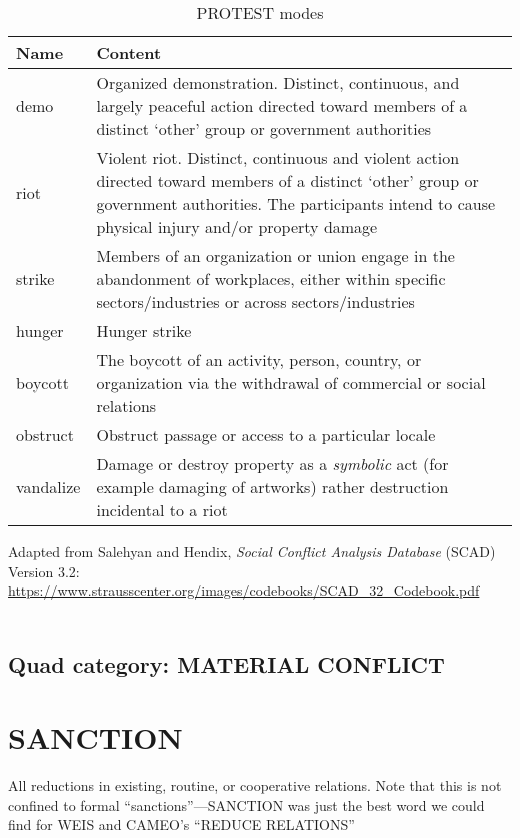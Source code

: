\documentclass[11pt]{report}
\newcommand{\plcat}[1]{\textsf{#1}}
\begin{document}
\begin{table}[htp]
\caption{PROTEST modes}
\begin{center}
\begin{tabular}{|l|p{13cm}|}
\hline
Name & Content \\
\hline
demo & Organized demonstration. Distinct, continuous, and largely peaceful action directed toward
members of a distinct `other' group or government authorities  \\
riot & Violent riot. Distinct, continuous and violent action directed toward members of
a distinct `other' group or government authorities. The participants intend to cause physical injury and/or property damage \\
strike & Members of an organization or union engage in the abandonment of
workplaces, either within specific sectors/industries or across sectors/industries\\
hunger & Hunger strike\\
boycott & The boycott of an activity, person, country, or organization via the withdrawal of commercial or social relations\\
obstruct & Obstruct passage or access to a particular locale \\
vandalize & Damage or destroy property  as a \textit{symbolic} act (for example damaging of artworks) rather destruction incidental to a riot \\
\hline
\end{tabular}
\end{center}
\label{tab:protestmode}
\raggedright{Adapted from Salehyan and Hendix, \textit{Social Conflict Analysis Database} (SCAD)
Version 3.2: \url{https://www.strausscenter.org/images/codebooks/SCAD\_32\_Codebook.pdf}}\\~

\end{table}%

\subsection{Quad category: MATERIAL CONFLICT}

\newpage

\section{SANCTION}

All reductions in existing, routine, or cooperative relations. Note that this is not confined to formal ``sanctions''---\plcat{SANCTION} was just the best word we could find for WEIS and CAMEO's ``REDUCE RELATIONS''
\end{document}
